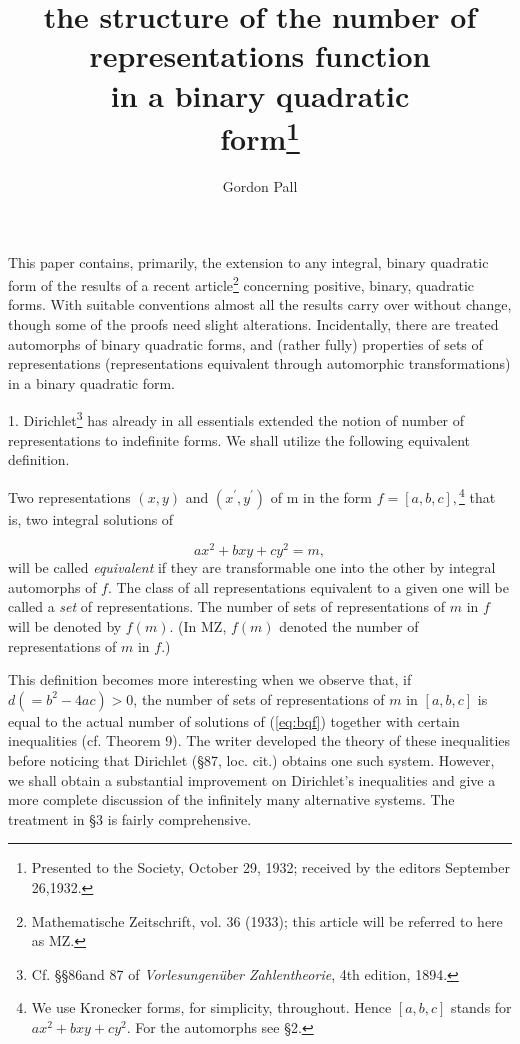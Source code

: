 \documentclass[10pt]{article}
\title{the structure of the number of \\ representations function \\ in a binary quadratic \\ form\protect\footnote{Presented to the Society, October 29, 1932; received by the editors September 26,1932.}}
\author{Gordon Pall}
\begin{document}
\maketitle

\setcounter{footnote}{1}
\setcounter{page}{491}

This paper contains, primarily, the extension to any integral, binary quadratic form of the results of a recent article\footnote{Mathematische Zeitschrift, vol. 36 (1933); this article will be referred to here as MZ.} concerning positive, binary, quadratic forms. With suitable conventions almost all the results carry over without change, though some of the proofs need slight alterations. Incidentally, there are treated automorphs of binary quadratic forms, and (rather fully) \; properties \hspace{1pt} of \hspace{1pt} sets \hspace{1pt} of \hspace{1pt} representations \hspace{1pt} (representations \hspace{1pt} equivalent \hspace{1pt} through automorphic transformations) in a binary quadratic form.

1. Dirichlet\footnote{Cf. §§86and 87 of \emph{Vorlesungen\"uber Zahlentheorie}, 4th edition, 1894.} has already in all essentials extended the notion of number of representations to indefinite forms. We shall utilize the following equivalent definition.

Two representations $(x,y)$ and $(x^\prime, y^\prime)$ of m in the form $f= [a, b, c ],$\footnote{We use Kronecker forms, for simplicity, throughout. Hence $[a, b, c]$ stands for $ax^2 + bxy + cy^2$. For the automorphs see §2.} that is, two integral solutions of

\begin{equation}
\label{eq:bqf}
ax^2 + b xy + c y^2 = m,	
\end{equation}
will be called \emph{equivalent} if they are transformable one into the other by integral automorphs of $f$. The class of all representations equivalent to a given one will be called a \emph{set} of representations. The number of sets of representations of $m$ in $f$ will be denoted by $f(m)$. (In MZ, $f(m)$ denoted the number of representations of $m$ in $f$.)

This definition becomes more interesting when we observe that, if $d( =b^2-4ac) > 0$, the number of sets of representations of $m$ in $[a, b, c]$ is equal to the actual number of solutions of (\ref{eq:bqf}) together with certain inequalities (cf. Theorem 9). The writer developed the theory of these inequalities before noticing that Dirichlet (§87, loc. cit.) obtains one such system. However, we shall obtain a substantial improvement on Dirichlet's inequalities and give a more complete discussion of the infinitely many alternative systems. The treatment in §3 is fairly comprehensive.
\end{document}

